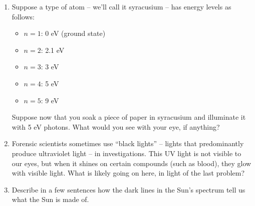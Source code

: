 \documentclass[12pt]{article}
\begin{document}
\begin{enumerate}
		
		\item Suppose a type of atom -- we'll call it syracusium -- has energy levels as follows:
		\begin{itemize}
			\item $n=1$: 0 eV (ground state)
			\item $n=2$: 2.1 eV
			\item $n=3$: 3 eV
			\item $n=4$: 5 eV
			\item $n=5$: 9 eV
		\end{itemize}
		
		Suppose now that you soak a piece of paper in syracusium and illuminate it with 5 eV photons. What would you see with your eye, if anything? 
		
		\vspace{1.7in}
		
		\item Forensic scientists sometimes use ``black lights'' -- lights that predominantly produce ultraviolet light -- in investigations. This UV light is not visible to our eyes, but when it shines on certain compounds 
		(such as blood), they glow with visible light. What is likely going on here, in light of the last problem?
		
		\vspace{1.7in}
		
		\item Describe in a few sentences how the dark lines in the Sun's spectrum tell us what the Sun is made of.
	\end{enumerate}
\end{document}
